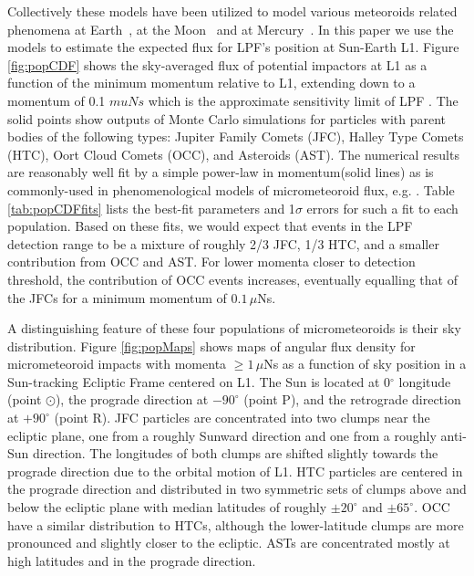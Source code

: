 \documentclass[twocolumn, trackchanges]{aastex62}
\begin{document}
Collectively these models have been utilized to model various meteoroids related phenomena at Earth~\cite[][]{CarrilloSanchez16, Janches17}, at the Moon~\cite{Janches18} and at Mercury~\cite{Pokorny17,Pokorny18}.  In this paper we use the models to estimate the expected flux for LPF's position at Sun-Earth L1. Figure \ref{fig:popCDF} shows the sky-averaged flux of potential impactors at L1 as a function of the minimum momentum relative to L1, extending down to a momentum of 0.1$\,\,mu Ns$ which is the approximate sensitivity limit of LPF \cite{Thorpe:2015cxa}. The solid points show outputs of Monte Carlo simulations for particles with parent bodies of the following types: Jupiter Family Comets (JFC), Halley Type Comets (HTC), Oort Cloud Comets (OCC), and Asteroids (AST).  The numerical results are reasonably well fit by a simple power-law in momentum(solid lines) as is commonly-used in phenomenological models of micrometeoroid flux, e.g. \cite{Grun1985}. Table \ref{tab:popCDFfits} lists the best-fit parameters and 1$\sigma$ errors for such a fit to each population. Based on these fits, we would expect that events in the LPF detection range to be a mixture of roughly 2/3 JFC, 1/3 HTC, and a smaller contribution from OCC and AST.  For lower momenta closer to detection threshold, the contribution of OCC events increases, eventually equalling that of the JFCs for a minimum momentum of $0.1\,\mu$Ns.  

A distinguishing feature of these four populations of micrometeoroids is their sky distribution.  Figure \ref{fig:popMaps} shows maps of angular flux density for micrometeoroid impacts with momenta $\geq 1\,\mu$Ns as a function of sky position in a Sun-tracking Ecliptic Frame centered on L1.  The Sun is located at 0$^\circ$ longitude (point $\odot$), the prograde direction at $-90^\circ$ (point P), and the retrograde direction at $+90^\circ$ (point R).  JFC particles are concentrated into two clumps near the ecliptic plane, one from a roughly Sunward direction and one from a roughly anti-Sun direction. The longitudes of both clumps are shifted slightly towards the prograde direction due to the orbital motion of L1. HTC particles are centered in the prograde direction and distributed in two symmetric sets of clumps above and below the ecliptic plane with median latitudes of roughly $\pm 20^\circ$ and $\pm 65^\circ$.  OCC have a similar distribution to HTCs, although the lower-latitude clumps are more pronounced and slightly closer to the ecliptic. ASTs are concentrated mostly at high latitudes and in the prograde direction. 
\end{document}
